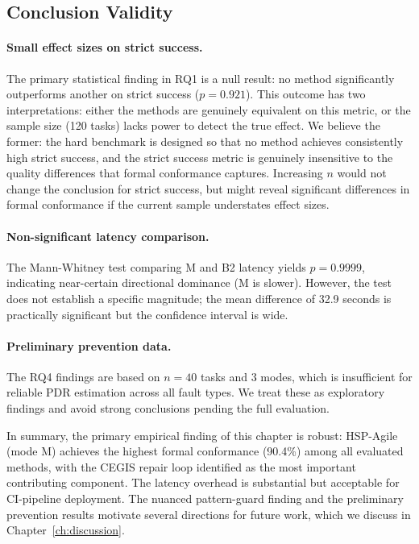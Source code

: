 \subsection{Conclusion Validity}

\paragraph{Small effect sizes on strict success.}
The primary statistical finding in RQ1 is a null result: no method significantly
outperforms another on strict success ($p = 0.921$).  This outcome has two
interpretations: either the methods are genuinely equivalent on this metric, or the
sample size (120 tasks) lacks power to detect the true effect.  We believe the
former: the hard benchmark is designed so that no method achieves consistently high
strict success, and the strict success metric is genuinely insensitive to the quality
differences that formal conformance captures.  Increasing $n$ would not change the
conclusion for strict success, but might reveal significant differences in formal
conformance if the current sample understates effect sizes.

\paragraph{Non-significant latency comparison.}
The Mann-Whitney test comparing M and B2 latency yields $p = 0.9999$, indicating
near-certain directional dominance (M is slower).  However, the test does not
establish a specific magnitude; the mean difference of 32.9 seconds is practically
significant but the confidence interval is wide.

\paragraph{Preliminary prevention data.}
The RQ4 findings are based on $n = 40$ tasks and 3 modes, which is insufficient for
reliable PDR estimation across all fault types.  We treat these as exploratory
findings and avoid strong conclusions pending the full evaluation.

\bigskip

\noindent In summary, the primary empirical finding of this chapter is robust:
HSP-Agile (mode M) achieves the highest formal conformance (90.4\%) among all
evaluated methods, with the CEGIS repair loop identified as the most important
contributing component.  The latency overhead is substantial but acceptable for
CI-pipeline deployment.  The nuanced pattern-guard finding and the preliminary
prevention results motivate several directions for future work, which we discuss in
Chapter~\ref{ch:discussion}.
